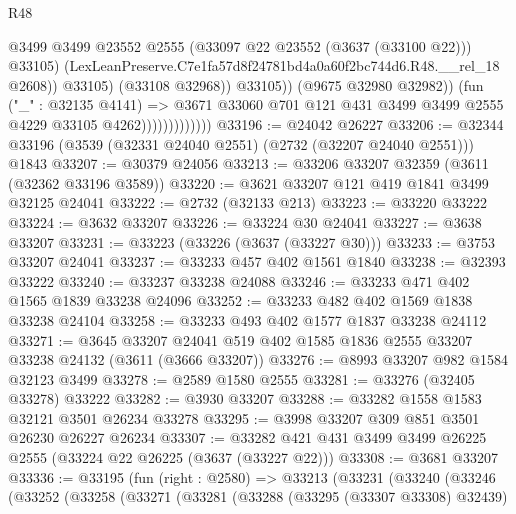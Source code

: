 \begin{lexlean}{R48}
\begin{coremodule}
                                          @3499
                                          @3499
                                          @23552
                                          @2555
                                          (@33097 @22 @23552 (@3637 (@33100 @22)))
                                          @33105)
                                        (LexLeanPreserve.C7e1fa57d8f24781bd4a0a60f2bc744d6.R48.__rel_18
                                          @2608))
                                      @33105)
                                    (@33108 @32968))
                                  @33105))
                              (@9675 @32980 @32982))
                            (fun ("_" : @32135 @4141) =>
                            @3671
                              @33060
                              @701
                              @121
                              @431
                              @3499
                              @3499
                              @2555
                              @4229
                              @33105
                              @4262)))))))))))))
@33196 := @24042 @26227
@33206 := @32344 @33196 (@3539 (@32331 @24040 @2551) (@2732 (@32207 @24040 @2551))) @1843
@33207 := @30379 @24056
@33213 := @33206 @33207 @32359 (@3611 (@32362 @33196 @3589))
@33220 := @3621 @33207 @121 @419 @1841 @3499 @32125 @24041
@33222 := @2732 (@32133 @213)
@33223 := @33220 @33222
@33224 := @3632 @33207
@33226 := @33224 @30 @24041
@33227 := @3638 @33207
@33231 := @33223 (@33226 (@3637 (@33227 @30)))
@33233 := @3753 @33207 @24041
@33237 := @33233 @457 @402 @1561 @1840
@33238 := @32393 @33222
@33240 := @33237 @33238 @24088
@33246 := @33233 @471 @402 @1565 @1839 @33238 @24096
@33252 := @33233 @482 @402 @1569 @1838 @33238 @24104
@33258 := @33233 @493 @402 @1577 @1837 @33238 @24112
@33271 := @3645
    @33207
    @24041
    @519
    @402
    @1585
    @1836
    @2555
    @33207
    @33238
    @24132
    (@3611 (@3666 @33207))
@33276 := @8993 @33207 @982 @1584 @32123 @3499
@33278 := @2589 @1580 @2555
@33281 := @33276 (@32405 @33278) @33222
@33282 := @3930 @33207
@33288 := @33282 @1558 @1583 @32121 @3501 @26234 @33278
@33295 := @3998 @33207 @309 @851 @3501 @26230 @26227 @26234
@33307 := @33282 @421 @431 @3499 @3499 @26225 @2555 (@33224 @22 @26225 (@3637 (@33227 @22)))
@33308 := @3681 @33207
@33336 := @33195
    (fun (right : @2580) =>
    @33213
      (@33231
        (@33240
          (@33246
            (@33252
              (@33258
                (@33271
                  (@33281
                    (@33288
                      (@33295 (@33307 @33308) @32439)

\end{coremodule}
\end{lexlean}
